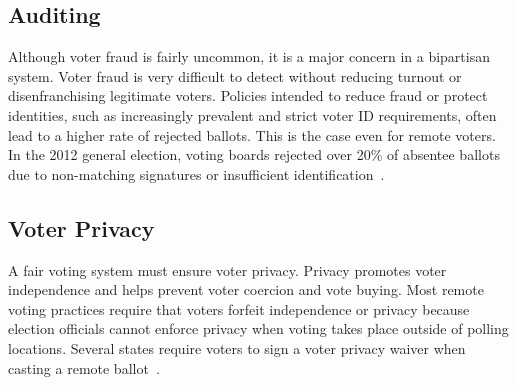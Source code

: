 \subsection{Auditing}

Although voter fraud is fairly uncommon, it is a major concern in a
bipartisan system. Voter fraud is very difficult to detect without
reducing turnout or disenfranchising legitimate voters. Policies
intended to reduce fraud or protect identities, such as increasingly
prevalent and strict voter ID requirements, often lead to a higher
rate of rejected ballots. This is the case even for remote voters. In
the 2012 general election, voting boards rejected over 20\% of
absentee ballots due to non-matching signatures or insufficient
identification~\cite{eacsurvey}.

\subsection{Voter Privacy}

A fair voting system must ensure voter privacy. Privacy promotes voter
independence and helps prevent voter coercion and vote buying. Most
remote voting practices require that voters forfeit independence or
privacy because election officials cannot enforce privacy when voting
takes place outside of polling locations. Several states require
voters to sign a voter privacy waiver when casting a remote
ballot~\cite{smithtime}.



